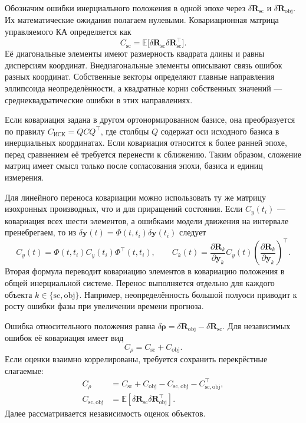 \documentclass[a4paper,11pt]{article}
\newcommand{\vect}[1]{\boldsymbol{#1}}
\numberwithin{equation}{section}
\begin{document}
Обозначим ошибки инерциального положения в одной эпохе через
$\delta\vect R_{\mathrm{sc}}$ и $\delta\vect R_{\mathrm{obj}}$.
Их математические ожидания полагаем нулевыми.
Ковариационная матрица управляемого КА определяется как
\[
C_{\mathrm{sc}}=\mathbb{E}\bigl[\delta\vect R_{\mathrm{sc}}\delta\vect R_{\mathrm{sc}}^\top\bigr].
\]
Её диагональные элементы имеют размерность квадрата длины
и равны дисперсиям координат. Внедиагональные элементы описывают
связь ошибок разных координат. Собственные векторы определяют
главные направления эллипсоида неопределённости, а квадратные
корни собственных значений --- среднеквадратические ошибки
в этих направлениях.

Если ковариация задана в другом ортонормированном базисе,
она преобразуется по правилу $C_{\text{ИСК}}=QCQ^\top$,
где столбцы $Q$ содержат оси исходного базиса в инерциальных
координатах. Если ковариация относится к более ранней эпохе,
перед сравнением её требуется перенести к сближению.
Таким образом, сложение матриц имеет смысл только после
согласования эпохи, базиса и единиц измерения.

Для линейного переноса ковариации можно использовать ту же
матрицу изохронных производных, что и для приращений состояния.
Если $C_y(t_i)$ --- ковариация всех шести элементов,
а ошибками модели движения на интервале пренебрегаем, то из
$\delta\vect y(t)=\Phi(t,t_i)\delta\vect y(t_i)$ следует
\begin{equation}
 C_y(t)=\Phi(t,t_i)C_y(t_i)\Phi^\top(t,t_i),\qquad
 C_k(t)=\frac{\partial\vect R_k}{\partial\vect y_k}
 C_y(t)\left(\frac{\partial\vect R_k}{\partial\vect y_k}\right)^\top.
 \label{eq:covariance-propagation}
\end{equation}
Вторая формула переводит ковариацию элементов в ковариацию
положения в общей инерциальной системе. Перенос выполняется
отдельно для каждого объекта $k\in\{\mathrm{sc},\mathrm{obj}\}$.
Например, неопределённость большой полуоси приводит
к росту ошибки фазы при увеличении времени прогноза.

Ошибка относительного положения равна
$\delta\vect\rho=\delta\vect R_{\mathrm{obj}}-\delta\vect R_{\mathrm{sc}}$.
Для независимых ошибок её ковариация имеет вид
\begin{equation}
C_{\rho}=C_{\mathrm{sc}}+C_{\mathrm{obj}}.
\label{eq:combined-covariance}
\end{equation}
Если оценки взаимно коррелированы, требуется сохранить
перекрёстные слагаемые:
\[
\begin{aligned}
C_{\rho}&=C_{\mathrm{sc}}+C_{\mathrm{obj}}
 -C_{\mathrm{sc},\mathrm{obj}}-C_{\mathrm{sc},\mathrm{obj}}^\top,\\
C_{\mathrm{sc},\mathrm{obj}}&=
\mathbb{E}[\delta\vect R_{\mathrm{sc}}\delta\vect R_{\mathrm{obj}}^\top].
\end{aligned}
\]
Далее рассматривается независимость оценок объектов.
\end{document}
